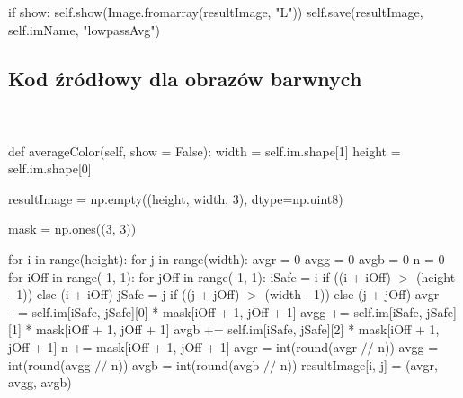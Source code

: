 \documentclass[final,a4paper,openany,12pt]{mwbk}
\begin{document}
if show: \newline
\indent self.show(Image.fromarray(resultImage, "L")) \newline
\indent self.save(resultImage, self.imName, "lowpassAvg") \newline
\newpage

\subsection*{Kod źródłowy dla obrazów barwnych}
\hfill
\\\\
\noindent def averageColor(self, show = False): \newline
\indent width = self.im.shape[1] \newline
\indent height = self.im.shape[0] \newline

resultImage = np.empty((height, width, 3), dtype=np.uint8) \newline

mask = np.ones((3, 3)) \newline

for i in range(height): \newline
\indent for j in range(width): \newline
\indent avgr = 0 \newline
\indent avgg = 0 \newline
\indent avgb = 0 \newline
\indent n = 0 \newline
\indent for iOff in range(-1, 1): \newline
\indent for jOff in range(-1, 1): \newline
\indent iSafe = i if ((i + iOff) $>$ (height - 1)) else (i + iOff) \newline
\indent jSafe = j if ((j + jOff) $>$ (width - 1)) else (j + jOff) \newline
\indent avgr += self.im[iSafe, jSafe][0] * mask[iOff + 1, jOff + 1] \newline
\indent avgg += self.im[iSafe, jSafe][1] * mask[iOff + 1, jOff + 1] \newline
\indent avgb += self.im[iSafe, jSafe][2] * mask[iOff + 1, jOff + 1] \newline
\indent n += mask[iOff + 1, jOff + 1] \newline
\indent avgr = int(round(avgr $//$ n)) \newline
\indent avgg = int(round(avgg $//$ n)) \newline
\indent avgb = int(round(avgb $//$ n)) \newline
\indent resultImage[i, j] = (avgr, avgg, avgb) \newline
\end{document}
